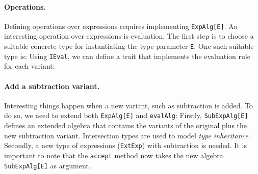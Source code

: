 
\paragraph{Operations.} Defining operations over expressions requires
implementing \lstinline{ExpAlg[E]}. An interesting operation over expressions is
evaluation. The first step is to choose a suitable concrete type for
instantiating the type parameter \lstinline{E}. One such suitable type is:
Using \lstinline{IEval}, we can define a trait that implements the evaluation
rule for each variant:


\paragraph{Add a subtraction variant.} Interesting things happen when a new
variant, such as subtraction is added. To do so, we need to extend both
\lstinline{ExpAlg[E]} and \lstinline{evalAlg}:
Firstly, \lstinline{SubExpAlg[E]} defines an extended algebra that contains the
variants of the original plus the new subtraction variant. Intersection types
are used to model \textit{type inheritance}. Secondly, a new type of expressions
(\lstinline{ExtExp}) with subtraction is needed. It is important to note that
the \lstinline{accept} method now takes the new algebra \lstinline{SubExpAlg[E]}
as argument.

